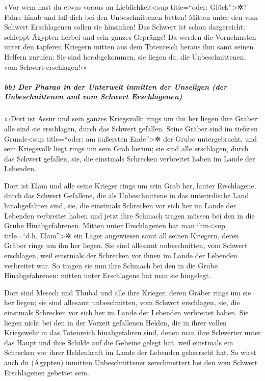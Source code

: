»Vor wem hast du etwas voraus an
Lieblichkeit\textless sup title=``oder: Glück''\textgreater✲? Fahre
hinab und laß dich bei den Unbeschnittenen betten! Mitten
unter den vom Schwert Erschlagenen sollen sie hinsinken! Das Schwert ist
schon dargereicht: schleppt Ägypten herbei und sein ganzes Gepränge!
Da werden die Vornehmsten unter den tapferen Kriegern
mitten aus dem Totenreich heraus ihm samt seinen Helfern zurufen: Sie
sind herabgekommen, sie liegen da, die Unbeschnittenen, vom Schwert
erschlagen!‹«

\hypertarget{bb-der-pharao-in-der-unterwelt-inmitten-der-unseligen-der-unbeschnittenen-und-vom-schwert-erschlagenen}{%
\subparagraph{bb) Der Pharao in der Unterwelt inmitten der Unseligen
(der Unbeschnittenen und vom Schwert
Erschlagenen)}\label{bb-der-pharao-in-der-unterwelt-inmitten-der-unseligen-der-unbeschnittenen-und-vom-schwert-erschlagenen}}

»›Dort ist Assur und sein ganzes Kriegsvolk; rings um ihn
her liegen ihre Gräber: alle sind sie erschlagen, durch das Schwert
gefallen. Seine Gräber sind im tiefsten
Grunde\textless sup title=``oder: am äußersten Ende''\textgreater✲ der
Grube untergebracht, und sein Kriegsvolk liegt rings um sein Grab herum;
sie sind alle erschlagen, durch das Schwert gefallen, sie, die einstmals
Schrecken verbreitet haben im Lande der Lebenden.

Dort ist Elam und alle seine Krieger rings um sein Grab
her, lauter Erschlagene, durch das Schwert Gefallene, die als
Unbeschnittene in das unterirdische Land hinabgefahren sind, sie, die
einstmals Schrecken vor sich her im Lande der Lebenden verbreitet haben
und jetzt ihre Schmach tragen müssen bei den in die Grube
Hinabgefahrenen. Mitten unter Erschlagenen hat man
ihm\textless sup title=``d.h. Elam''\textgreater✲ ein Lager angewiesen
samt all seinen Kriegern, deren Gräber rings um ihn her liegen. Sie sind
allesamt unbeschnitten, vom Schwert erschlagen, weil einstmals der
Schrecken vor ihnen im Lande der Lebenden verbreitet war. So tragen sie
nun ihre Schmach bei den in die Grube Hinabgefahrenen: mitten unter
Erschlagene hat man sie hingelegt.

Dort sind Mesech und Thubal und alle ihre Krieger, deren
Gräber rings um sie her liegen; sie sind allesamt unbeschnitten, vom
Schwert erschlagen, sie, die einstmals Schrecken vor sich her im Lande
der Lebenden verbreitet haben. Sie liegen nicht bei den
in der Vorzeit gefallenen Helden, die in ihrer vollen Kriegswehr in das
Totenreich hinabgefahren sind, denen man ihre Schwerter unter das Haupt
und ihre Schilde auf die Gebeine gelegt hat, weil einstmals ein
Schrecken vor ihrer Heldenkraft im Lande der Lebenden geherrscht hat.
So wirst auch du (Ägypten) inmitten Unbeschnittener
zerschmettert bei den vom Schwert Erschlagenen gebettet sein.


